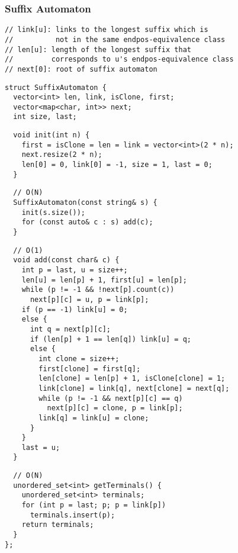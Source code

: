 \documentclass[twoside]{article}
\begin{document}
\begin{multicols*}{2}
\subsubsection*{Suffix Automaton}
\begin{verbatim}
// link[u]: links to the longest suffix which is
//          not in the same endpos-equivalence class
// len[u]: length of the longest suffix that
//         corresponds to u's endpos-equivalence class
// next[0]: root of suffix automaton
\end{verbatim}
\vspace{-12pt}
\begin{verbatim}
struct SuffixAutomaton {
  vector<int> len, link, isClone, first;
  vector<map<char, int>> next;
  int size, last;
\end{verbatim}
\vspace{-12pt}
\begin{verbatim}
  void init(int n) {
    first = isClone = len = link = vector<int>(2 * n);
    next.resize(2 * n);
    len[0] = 0, link[0] = -1, size = 1, last = 0;
  }
\end{verbatim}
\vspace{-12pt}
\begin{verbatim}
  // O(N)
  SuffixAutomaton(const string& s) {
    init(s.size());
    for (const auto& c : s) add(c);
  }
\end{verbatim}
\vspace{-12pt}
\begin{verbatim}
  // O(1)
  void add(const char& c) {
    int p = last, u = size++;
    len[u] = len[p] + 1, first[u] = len[p];
    while (p != -1 && !next[p].count(c))
      next[p][c] = u, p = link[p];
    if (p == -1) link[u] = 0;
    else {
      int q = next[p][c];
      if (len[p] + 1 == len[q]) link[u] = q;
      else {
        int clone = size++;
        first[clone] = first[q];
        len[clone] = len[p] + 1, isClone[clone] = 1;
        link[clone] = link[q], next[clone] = next[q];
        while (p != -1 && next[p][c] == q)
          next[p][c] = clone, p = link[p];
        link[q] = link[u] = clone;
      }
    }
    last = u;
  }
\end{verbatim}
\vspace{-12pt}
\begin{verbatim}
  // O(N)
  unordered_set<int> getTerminals() {
    unordered_set<int> terminals;
    for (int p = last; p; p = link[p])
      terminals.insert(p);
    return terminals;
  }
};
\end{verbatim}


\end{multicols*}
\end{document}
